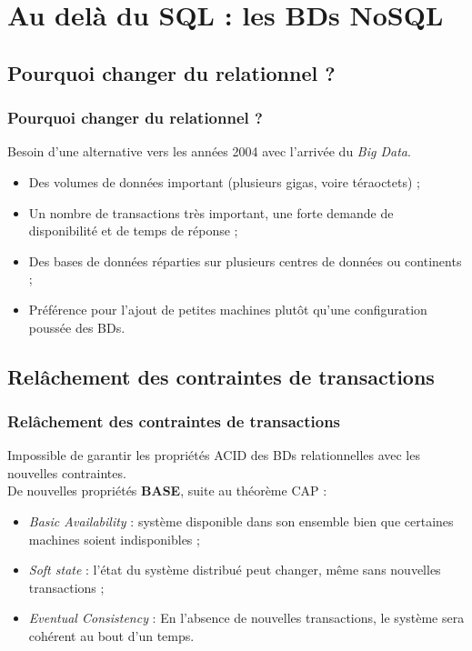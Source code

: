 \section{Au delà du SQL : les BDs NoSQL}

	\subsection{Pourquoi changer du relationnel ?}
	\begin{frame}
		\frametitle{Pourquoi changer du relationnel ?}

		Besoin d'une alternative vers les années 2004 avec l'arrivée du \textit{Big Data}.
		\begin{itemize}
			\item Des volumes de données important (plusieurs gigas, voire téraoctets) ;
			\item Un nombre de transactions très important, une forte demande de disponibilité et de temps de réponse ;
			\item Des bases de données réparties sur plusieurs centres de données ou continents ;
			\item Préférence pour l'ajout de petites machines plutôt qu'une configuration poussée des BDs.
		\end{itemize}

	\end{frame}

	\subsection{Relâchement des contraintes de transactions}
	\begin{frame}
		\frametitle{Relâchement des contraintes de transactions}

		Impossible de garantir les propriétés ACID des BDs relationnelles avec les nouvelles contraintes.\\
		\vspace{10px}
		De nouvelles propriétés \textbf{BASE}, suite au théorème CAP :
		\begin{itemize}
			\item \textit{Basic Availability} : système disponible dans son ensemble bien que certaines machines soient indisponibles ;
			\item \textit{Soft state} : l'état du système distribué peut changer, même sans nouvelles transactions ;
			\item \textit{Eventual Consistency} : En l'absence de nouvelles transactions, le système sera cohérent au bout d'un temps.
		\end{itemize}

	\end{frame}

